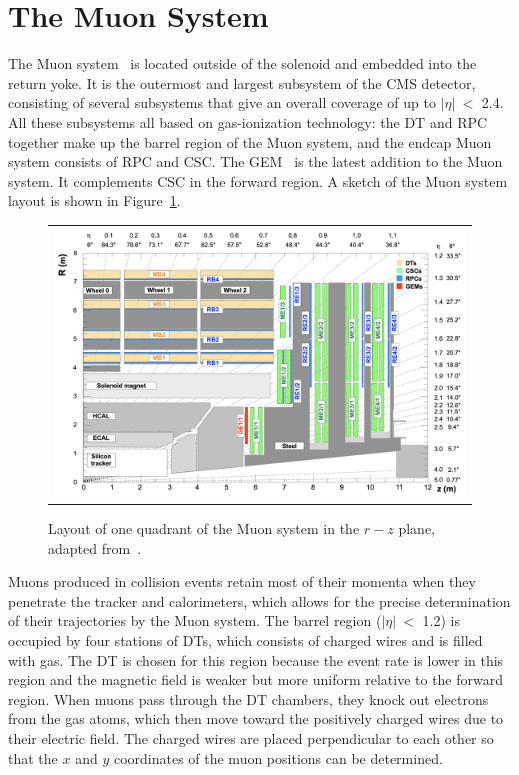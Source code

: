\section{The Muon System}
\label{sec:MuonSys}

The Muon system~\cite{CMS:1997iti} is located outside of the solenoid and embedded into the return yoke. It is the outermost and largest subsystem of the \ac{CMS} detector, consisting of several subsystems that give an overall coverage of up to $|\eta|~<$ 2.4. All these subsystems all based on gas-ionization technology: the \ac{DT} and \ac{RPC} together make up the barrel region of the Muon system, and the endcap Muon system consists of \ac{RPC} and \ac{CSC}. The \ac{GEM}~\cite{Colaleo:2015vsq} is the latest addition to the Muon system. It complements \ac{CSC} in the forward region. A sketch of the Muon system layout is shown in Figure~\ref{fig:Muon}.

\begin{figure}[tbh!]
 \begin{center}
 \begin{tabular}{c}
 \includegraphics[width=1\textwidth]{figures/Part2/CMS/Muon}
 \end{tabular}
 \caption{Layout of one quadrant of the Muon system in the $r-z$ plane, adapted from~\cite{Colaleo:2015vsq}.}
 \label{fig:Muon}
 \end{center}
\end{figure}

Muons produced in collision events retain most of their momenta when they penetrate the tracker and calorimeters, which allows for the precise determination of their trajectories by the Muon system. The barrel region ($|\eta|~<$ 1.2) is occupied by four stations of \acp{DT}, which consists of charged wires and is filled with gas. The \ac{DT} is chosen for this region because the event rate is lower in this region and the magnetic field is weaker but more uniform relative to the forward region. When muons pass through the \ac{DT} chambers, they knock out electrons from the gas atoms, which then move toward the positively charged wires due to their electric field. The charged wires are placed perpendicular to each other so that the $x$ and $y$ coordinates of the muon positions can be determined. 

